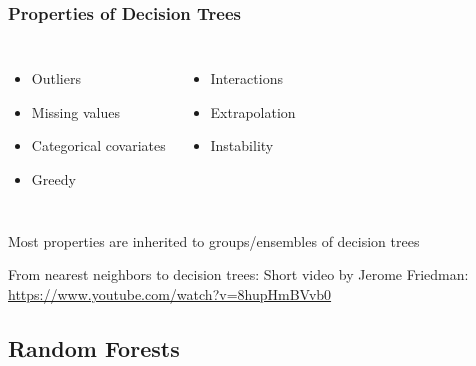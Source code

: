 \begin{frame}
	\frametitle{Properties of Decision Trees}
	
	\begin{columns}[onlytextwidth]
		\begin{itemize}
			\item Outliers
			\item Missing values
			\item Categorical covariates
			\item Greedy
		\end{itemize}
		
		\begin{itemize}
			\item Interactions
			\item Extrapolation
			\item Instability
			
			\vphantom{T}
		\end{itemize}
	\end{columns}
	
	\vfill 
	
	Most properties are inherited to groups/ensembles of decision trees
	
	\vfill
	
	From nearest neighbors to decision trees: Short video by Jerome Friedman: \url{https://www.youtube.com/watch?v=8hupHmBVvb0}
\end{frame}

\subsection{Random Forests}

